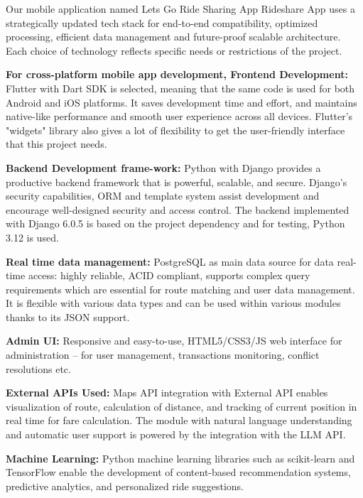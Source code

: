 
Our mobile application named Lets Go Ride Sharing App Rideshare App uses a strategically updated tech stack for end-to-end compatibility, optimized processing, efficient data management and future-proof scalable architecture. Each choice of technology reflects specific needs or restrictions of the project.

\textbf{For cross-platform mobile app development, Frontend Development:} Flutter with Dart SDK is selected, meaning that the same code is used for both Android and iOS platforms. It saves development time and effort, and maintains native-like performance and smooth user experience across all devices. Flutter's "widgets" library also gives a lot of flexibility to get the user-friendly interface that this project needs.

\textbf{Backend Development frame-work:} Python with Django provides a productive backend framework that is powerful, scalable, and secure. Django's security capabilities, ORM and template system assist development and encourage well-designed security and access control. The backend implemented with Django 6.0.5 is based on the project dependency and for testing, Python 3.12 is used.

\textbf{Real time data management:} PostgreSQL as main data source for data real-time access: highly reliable, ACID compliant, supports complex query requirements which are essential for route matching and user data management. It is flexible with various data types and can be used within various modules thanks to its JSON support.

\textbf{Admin UI: } Responsive and easy-to-use, HTML5/CSS3/JS web interface for administration – for user management, transactions monitoring, conflict resolutions etc.

\textbf{External APIs Used:} Maps API integration with External API enables visualization of route, calculation of distance, and tracking of current position in real time for fare calculation. The module with natural language understanding and automatic user support is powered by the integration with the LLM API.

\textbf{Machine Learning:} Python machine learning libraries such as scikit-learn and TensorFlow enable the development of content-based recommendation systems, predictive analytics, and personalized ride suggestions.

